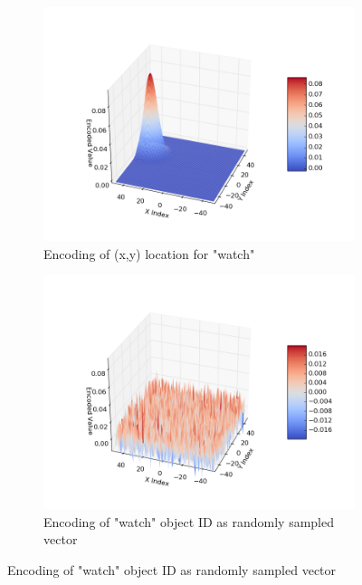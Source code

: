\documentclass[conference]{IEEEtran}
\begin{document}
\begin{figure}[th!]
		\begin{subfigure}{0.45\columnwidth}
			\center
			\includegraphics[width=\linewidth]{img/coord_example_1.png}
			\caption{Encoding of (x,y) location for "watch"}
			\label{fig:encoding-coord}
		\end{subfigure}
		\begin{subfigure}{0.45\columnwidth}
			\center
			\includegraphics[width=\linewidth]{img/coord_example_2.png}
			\caption{Encoding of "watch" object ID as randomly sampled vector}
			\label{fig:encoding-object}
		\end{subfigure}
		

\end{figure}
\end{document}

